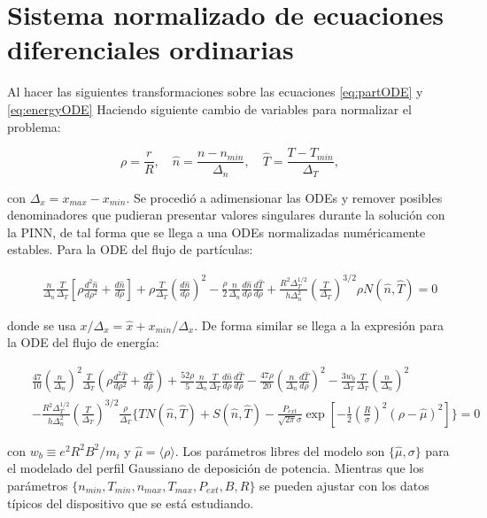 \section{Sistema normalizado de ecuaciones diferenciales ordinarias}
Al hacer las siguientes transformaciones sobre las ecuaciones \eqref{eq:partODE}  y \eqref{eq:energyODE} Haciendo siguiente cambio de variables para normalizar el problema:

\begin{equation}
	\rho = \frac{r}{R}, \quad \hat{n} = \frac{n - n_{min}}{\Delta_n}, \quad  \hat{T} = \frac{T - T_{min}}{\Delta_T},
\end{equation}

con $\Delta_x = x_{max} - x_{min}$. Se procedió a adimensionar las ODEs y remover posibles denominadores que pudieran presentar valores singulares durante la solución con la PINN, de tal forma que se llega a una ODEs normalizadas numéricamente estables. Para la ODE del flujo de partículas:

\begin{eqnarray}\label{eq:partODEnorm}
	&&\frac{n}{\Delta_n}\frac{T}{\Delta_T}\left[\rho\frac{d^2\hat{n}}{d\rho^2} + \frac{d\hat{n}}{d\rho}\right] + \rho\frac{T}{\Delta_T}\left(\frac{d\hat{n}}{d\rho}\right)^2- \frac{\rho}{2}\frac{n}{\Delta_n}\frac{d\hat{n}}{d\rho}\frac{d\hat{T}}{d\rho}+ \frac{R^2\Delta_T^{1/2}}{h\Delta_n^2}\left(\frac{T}{\Delta_T}\right)^{3/2}\rho N(\hat{n}, \hat{T}) = 0
\end{eqnarray}

donde se usa $x / \Delta_x =\hat{x} + x_{min}/\Delta_x$. De forma similar se llega a la expresión para la ODE del flujo de energía:

\begin{eqnarray}\label{eq:energyODEnorm}
	&& \frac{47}{10}\left(\frac{n}{\Delta_n}\right)^2\frac{T}{\Delta_T}\left(\rho\frac{d^2\hat{T}}{d\rho^2} + \frac{d\hat{T}}{d\rho}\right) +  \frac{52\rho}{5}\frac{n}{\Delta_n}\frac{T}{\Delta_T}\frac{d\hat{n}}{d\rho}\frac{d\hat{T}}{d\rho} -\frac{47\rho}{20}\left(\frac{n}{\Delta_n}\frac{d\hat{T}}{d\rho}\right)^2 - \frac{3w_b}{\Delta_T}\frac{T}{\Delta_T}\left(\frac{n}{\Delta_n}\right)^2 \nonumber\\ 
	&&- \frac{R^2\Delta_T^{1/2}}{h\Delta_n^2}\left(\frac{T}{\Delta_T}\right)^{3/2}\frac{\rho}{\Delta_T} \biggl\{TN(\hat{n},\hat{T})+S(\hat{n},\hat{T}) -\frac{P_{ext}}{\sqrt{2\pi}\sigma}\exp{\left[-\frac{1}{2}\left(\frac{R}{\sigma}\right)^2(\rho-\hat{\mu})^2\right]}\biggl\} = 0
\end{eqnarray}

con $w_b \equiv e^2R^2B^2 / m_i$ y $\hat{\mu} = \langle \rho \rangle$. Los parámetros libres del modelo son $\{\hat{\mu}, \sigma\}$ para el modelado del perfil Gaussiano de deposición de potencia. Mientras que los parámetros $\{n_{min}, T_{min}, n_{max}, T_{max}, P_{ext}, B, R\}$ se pueden ajustar con los datos típicos del dispositivo que se está estudiando.

